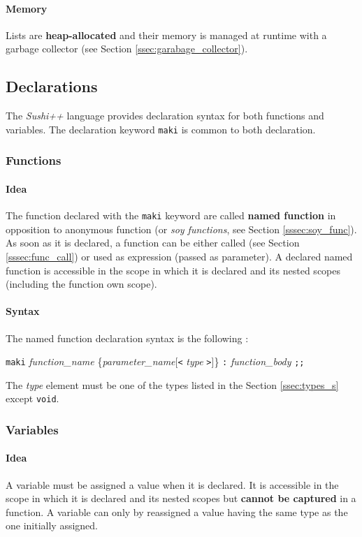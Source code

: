 \documentclass[a4paper,11pt]{article}
\begin{document}
\paragraph{Memory} Lists are \textbf{heap-allocated} and their memory is managed at runtime with a garbage collector (see Section \ref{ssec:garabage_collector}).

\subsection{Declarations}

The \textit{Sushi++} language provides declaration syntax for both functions and variables. The declaration keyword \texttt{maki} is common to both declaration.

\subsubsection{Functions}
\label{sssec:decl_func}
\paragraph{Idea} The function declared with the \texttt{maki} keyword are called \textbf{named function} in opposition to anonymous function (or \textit{soy functions}, see Section \ref{sssec:soy_func}). As soon as it is declared, a function can be either called (see Section \ref{sssec:func_call}) or used as expression (passed as parameter). A declared named function is accessible in the scope in which it is declared and its nested scopes (including the function own scope).
\paragraph{Syntax}  The named function declaration syntax is the following : 
\begin{center}
\texttt{maki} \textit{function\_name} \{\textit{parameter\_name}[\texttt{<} \textit{type} \texttt{>}]\} \texttt{:} \textit{function\_body} \texttt{;;}
\end{center}
The \textit{type} element must be one of the types listed in the Section \ref{ssec:types_s} except \texttt{void}.
\subsubsection{Variables}
\paragraph{Idea} A variable must be assigned a value when it is declared. It is accessible in the scope in which it is declared and its nested scopes but \textbf{cannot be captured} in a function. A variable can only by reassigned a value having the same type as the one initially assigned.
\end{document}
